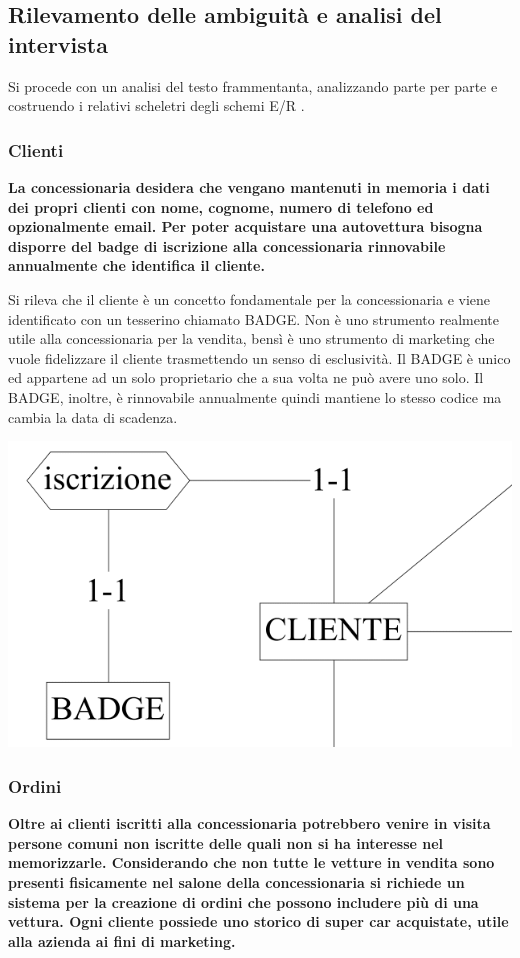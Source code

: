 \documentclass[11pt]{article}
\begin{document}
\subsection{Rilevamento delle ambiguità e analisi del intervista} 

Si procede con un analisi del testo frammentanta, analizzando parte per parte e
costruendo i relativi scheletri degli schemi E/R .

\subsubsection{Clienti}
\textbf{La concessionaria desidera che vengano mantenuti in memoria i dati dei propri
clienti con nome, cognome, numero di telefono ed opzionalmente email. Per poter
acquistare una autovettura bisogna disporre del badge di iscrizione alla
concessionaria rinnovabile annualmente che identifica il cliente.}

Si rileva che il cliente è un concetto fondamentale per la concessionaria e
viene identificato con un tesserino chiamato BADGE. Non è uno strumento
realmente utile alla concessionaria per la vendita, bensì è uno strumento di
marketing che vuole fidelizzare il cliente trasmettendo un senso di esclusività.
Il BADGE è unico ed appartene ad un solo proprietario che a sua volta ne può
avere uno solo. Il BADGE, inoltre, è rinnovabile annualmente quindi mantiene lo
stesso codice ma cambia la data di scadenza.

\begin{center}
    \includegraphics[width=\linewidth]{images/partialSchemes/cliente.png}
\end{center}

\subsubsection{Ordini}
\textbf{Oltre ai clienti iscritti alla concessionaria potrebbero venire in visita
persone comuni non iscritte delle quali non si ha interesse nel memorizzarle.
Considerando che non tutte le vetture in vendita sono presenti fisicamente nel
salone della concessionaria si richiede un sistema per la creazione di ordini
che possono includere più di una vettura. Ogni cliente possiede uno storico di
super car acquistate, utile alla azienda ai fini di marketing.}
\end{document}
